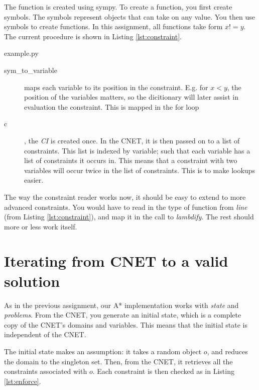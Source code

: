 \documentclass[journal]{IEEEtran}
\begin{document}
The function is created using sympy. To create a function, you first create
symbols. The symbols represent objects that can take on any value.
You then use symbols to create functions. In this assignment, all 
functions take form $x != y$. The current procedure is shown in Listing \autoref{lst:constraint}.

\begin{lstinputlisting}[caption="Creation of constraint",language=Python]{example.py}
    \label{lst:constraint}
\end{lstinputlisting}

\begin{description}
    \item[sym\_to\_variable] maps each variable to its position in the
        constraint. E.g. for $x < y$, the position of the variables matters, so the 
        dicitionary will later assist in evaluation the constraint.
        This is mapped in the for loop
    \item[c], the \textit{CI} is created once. In the CNET, it is then passed
        on to a list of constraints. This list is indexed by variable;
        such that each variable has a list of constraints it occurs in.
        This means that a constraint with two variables will occur
        twice in the list of constraints. This is to make lookups easier.
\end{description}

The way the constraint reader works now, it should be easy to extend
to more advanced constraints. You would have to read in the type of function
from \textit{line} (from Listing \autoref{lst:constraint}), and map it in 
the call to \textit{lambdify}. The rest should more or less work itself.

\section{Iterating from CNET to a valid solution}
As in the previous assignment, our A* implementation works with \textit{state} and 
\textit{problems}. From the CNET, you generate an initial state, which is a complete
copy of the CNET's domains and variables. This means that the initial state
is independent of the CNET.

The initial state makes an assumption: it takes a random object $o$, and reduces
the domain to the singleton set. Then, from the CNET, 
it retrieves all the constraints associated with $o$. Each constraint is
then checked as in Listing \autoref{lst:enforce}. 
\end{document}
